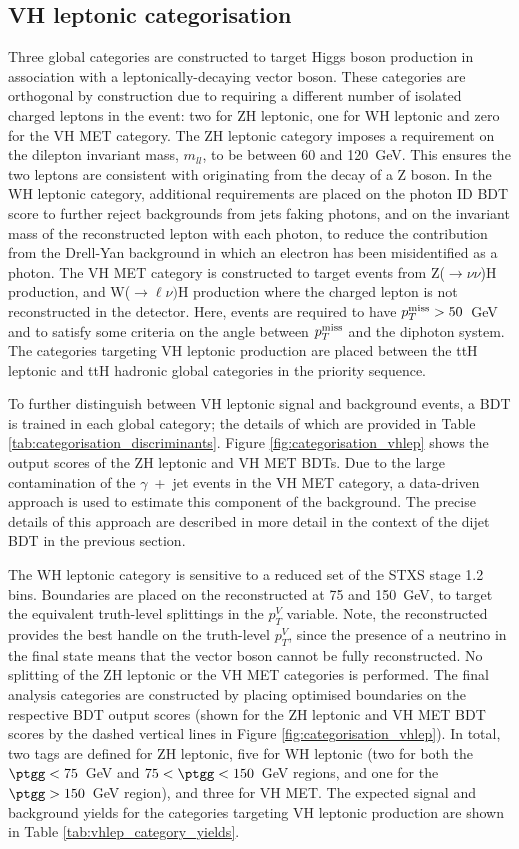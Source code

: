 \subsection{VH leptonic categorisation}
Three global categories are constructed to target Higgs boson production in association with a leptonically-decaying vector boson. These categories are orthogonal by construction due to requiring a different number of isolated charged leptons in the event: two for ZH leptonic, one for WH leptonic and zero for the VH MET category. The ZH leptonic category imposes a requirement on the dilepton invariant mass, $m_{ll}$, to be between 60 and 120~GeV. This ensures the two leptons are consistent with originating from the decay of a Z boson. In the WH leptonic category, additional requirements are placed on the photon ID BDT score to further reject backgrounds from jets faking photons, and on the invariant mass of the reconstructed lepton with each photon, to reduce the contribution from the Drell-Yan background in which an electron has been misidentified as a photon. The VH MET category is constructed to target events from Z($\rightarrow\nu\nu$)H production, and W($\rightarrow\ell\nu)$H production where the charged lepton is not reconstructed in the detector. Here, events are required to have $p_T^{\rm{miss}}>50$~GeV and to satisfy some criteria on the angle between $p_T^{\rm{miss}}$ and the diphoton system. The categories targeting VH leptonic production are placed between the ttH leptonic and ttH hadronic global categories in the priority sequence.

To further distinguish between VH leptonic signal and background events, a BDT is trained in each global category; the details of which are provided in Table \ref{tab:categorisation_discriminants}. Figure \ref{fig:categorisation_vhlep} shows the output scores of the ZH leptonic and VH MET BDTs. Due to the large contamination of the $\gamma$~+~jet events in the VH MET category, a data-driven approach is used to estimate this component of the background. The precise details of this approach are described in more detail in the context of the dijet BDT in the previous section.

The WH leptonic category is sensitive to a reduced set of the STXS stage 1.2 bins. Boundaries are placed on the reconstructed \ptgg at 75 and 150~GeV, to target the equivalent truth-level splittings in the $p_T^V$ variable. Note, the reconstructed \ptgg provides the best handle on the truth-level $p_T^V$, since the presence of a neutrino in the final state means that the vector boson cannot be fully reconstructed. No splitting of the ZH leptonic or the VH MET categories is performed. The final analysis categories are constructed by placing optimised boundaries on the respective BDT output scores (shown for the ZH leptonic and VH MET BDT scores by the dashed vertical lines in Figure \ref{fig:categorisation_vhlep}). In total, two tags are defined for ZH leptonic, five for WH leptonic (two for both the $\ptgg<75$~GeV and $75<\ptgg<150$~GeV regions, and one for the $\ptgg>150$~GeV region), and three for VH MET. The expected signal and background yields for the categories targeting VH leptonic production are shown in Table \ref{tab:vhlep_category_yields}.

